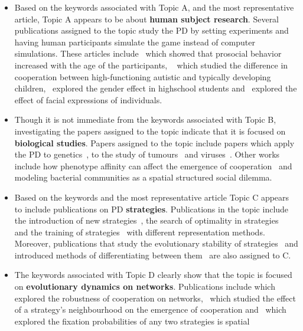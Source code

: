 \documentclass{article}
\theoremstyle{definition}
\begin{document}
\begin{itemize}
    \item Based on the keywords associated with Topic A, and the most
    representative article, Topic A appears to be about \textbf{human subject
    research}. Several publications assigned to the topic study the PD by
    setting experiments and having human participants simulate the game
    instead of computer simulations. These articles include~\cite{Matsumoto2016}
    which showed that prosocial behavior increased with the age of the
    participants, ~\cite{Li2014} which studied the difference in cooperation
    between high-functioning autistic and typically developing
    children,~\cite{Molina2013} explored the gender effect in highschool
    students and~\cite{Bell2017} explored the effect of facial expressions of
    individuals.
    \item Though it is not immediate from the keywords associated with
    Topic B, investigating the papers assigned to the topic indicate that it
    is focused on \textbf{biological studies}. Papers assigned to the topic include
    papers which apply the PD to genetics~\cite{Sistrom2015}, to
    the study of tumours~\cite{sartakhti2017} and
    viruses~\cite{Turner1999}. Other works include how phenotype affinity
    can affect the emergence of cooperation~\cite{wu2019phenotype} and modeling
    bacterial communities as a spatial structured social dilemma.
    \item Based on the keywords and the most representative article Topic
    C appears to include publications on PD \textbf{strategies}. Publications
    in the topic include the introduction of new strategies~\cite{stewart2013extortion},
    the search of optimality in strategies~\cite{banerjee2007reaching} and the
    training of strategies~\cite{ishibuchi2011evolution} with different
    representation methods. Moreover, publications that study the evolutionary
    stability of strategies~\cite{adami2013evolutionary} and introduced methods
    of differentiating between them~\cite{ashlock2008fingerprinting} are
    also assigned to C.
    \item The keywords associated with Topic D clearly show that the topic
    is focused on \textbf{evolutionary dynamics on networks}. Publications include
    \cite{ichinose2013robustness} which explored the robustness of cooperation
    on networks,~\cite{wang2012spatial} which studied the effect of a strategy's neighbourhood
    on the emergence of cooperation and~\cite{chen2016fixation} which explored
    the fixation probabilities of any two strategies is spatial

\end{itemize}
\end{document}
